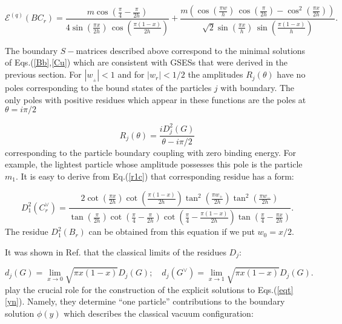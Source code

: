 \documentclass[a4paper,12pt,titlepage,final]{article}
\begin{document}
\begin{equation}
\mathcal{E}^{(q)}(BC_{r})=\frac{m\cos (\frac{\pi }{4}-\frac{\pi }{2h})}
{4\sin (\frac{\pi x}{2h})\,\cos (\frac{\pi (1-x)}{2h})}+
\frac{m(\cos (\frac{\pi w}{h})\,\cos (\frac{\pi }{2h})-
\cos ^{2}(\frac{\pi x}{2h}))}
{\sqrt{2}\sin (\frac{\pi x}{h})\,\sin (\frac{\pi (1-x)}{h})}.  \label{v}
\end{equation}

The boundary $S-$matrices described above correspond to the minimal
solutions of Eqs.(\ref{Bb},\ref{Cu}) which are consistent with GSESs that
were derived in the previous section. For $\left| w_{_{\pm }}\right| <1$ and
for $|w_{r}|<1/2$ the amplitudes $R_{j}(\theta )$ have no poles
corresponding to the bound states of the particles $j$ with boundary. The
only poles with positive residues which appear in these functions are the
poles at $\theta =i\pi /2$

\begin{equation}
R_{j}(\theta )=\frac{iD_{j}^{2}(G)}{\theta -i\pi /2}  \label{dsq}
\end{equation}
corresponding to the particle boundary coupling with zero binding energy.
For example, the lightest particle whose amplitude possesses this pole is
the particle $m_{1}$. It is easy to derive from Eq.(\ref{r1c}) that
corresponding residue has a form:

\begin{equation}
D_{1}^{2}(C_{r}^{\vee })=\frac{2\cot \left( \frac{\pi x}{2h}\right) \cot
\left( \frac{\pi (1-x)}{2h}\right) \tan ^{2}\left( \frac{\pi w_{+}}{2h}
\right) \tan ^{2}\left( \frac{\pi w_{-}}{2h}\right) }{\tan \left( \frac{\pi
}{2h}\right) \cot \left( \frac{\pi }{4}-\frac{\pi }{2h}\right) \cot \left(
\frac{\pi }{4}-\frac{\pi (1-x)}{2h}\right) \tan \left( \frac{\pi }{4}-
\frac{\pi x}{2h}\right) }.  \label{r}
\end{equation}
The residue $D_{1}^{2}(B_{r})$ can be obtained from this equation if we put
$w_{0}=x/2$.

It was shown in Ref.\cite{FO} that the classical limits of the residues
$D_{j}$:

\begin{equation}
d_{j}(G)=\lim_{x\rightarrow 0}\sqrt{\pi x(1-x)}D_{j}(G);\quad d_{j}(G^{\vee
})=\lim_{x\rightarrow 1}\sqrt{\pi x(1-x)}D_{j}(G).  \label{dgg}
\end{equation}
play the crucial role for the construction of the explicit solutions
to Eqs.(\ref{eqt}\ref{yn}).
Namely, they determine ``one particle'' contributions to
the boundary solution $\phi (y)$ which describes the classical vacuum
configuration:
\end{document}
